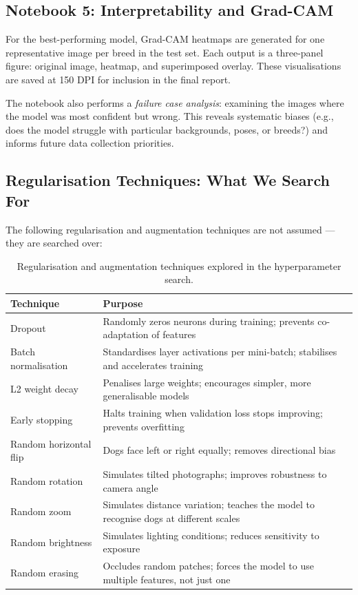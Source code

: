\subsection{Notebook 5: Interpretability and Grad-CAM}

For the best-performing model, Grad-CAM heatmaps are generated for one representative image per breed in the test set. Each output is a three-panel figure: original image, heatmap, and superimposed overlay. These visualisations are saved at 150 DPI for inclusion in the final report.

The notebook also performs a \textit{failure case analysis}: examining the images where the model was most confident but wrong. This reveals systematic biases (e.g., does the model struggle with particular backgrounds, poses, or breeds?) and informs future data collection priorities.

\subsection{Regularisation Techniques: What We Search For}

The following regularisation and augmentation techniques are not assumed --- they are searched over:

\begin{table}[H]
\centering
\caption{Regularisation and augmentation techniques explored in the hyperparameter search.}
\label{tab:regularisation}
\begin{tabular}{lp{8cm}}
\toprule
\textbf{Technique} & \textbf{Purpose} \\
\midrule
Dropout & Randomly zeros neurons during training; prevents co-adaptation of features \\
Batch normalisation & Standardises layer activations per mini-batch; stabilises and accelerates training \\
L2 weight decay & Penalises large weights; encourages simpler, more generalisable models \\
Early stopping & Halts training when validation loss stops improving; prevents overfitting \\
Random horizontal flip & Dogs face left or right equally; removes directional bias \\
Random rotation & Simulates tilted photographs; improves robustness to camera angle \\
Random zoom & Simulates distance variation; teaches the model to recognise dogs at different scales \\
Random brightness & Simulates lighting conditions; reduces sensitivity to exposure \\
Random erasing & Occludes random patches; forces the model to use multiple features, not just one \\
\bottomrule
\end{tabular}
\end{table}

